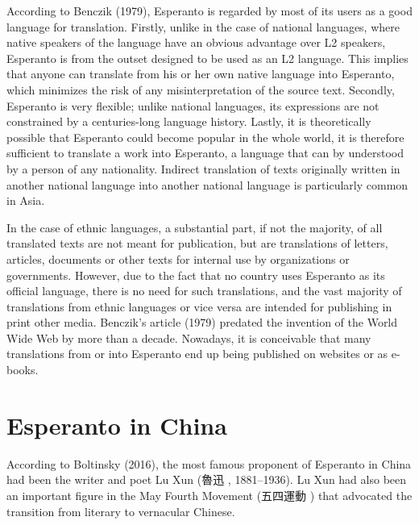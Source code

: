 
According to Benczik (1979), Esperanto is regarded by most of its users as a good language for translation.
Firstly, unlike in the case of national languages, where native speakers of the language have an obvious advantage over L2 speakers, Esperanto is from the outset designed to be used as an L2 language.
This implies that anyone can translate from his or her own native language into Esperanto, which minimizes the risk of any misinterpretation of the source text.
Secondly, Esperanto is very flexible; unlike national languages, its expressions are not constrained by a centuries-long language history.
Lastly, it is theoretically possible that Esperanto could become popular in the whole world, it is therefore sufficient to translate a work into Esperanto, a language that can by understood by a person of any nationality.
Indirect translation of texts originally written in another national language into another national language is particularly common in Asia.

In the case of ethnic languages, a substantial part, if not the majority, of all translated texts are not meant for publication, but are translations of letters, articles, documents or other texts for internal use by organizations or governments.
However, due to the fact that no country uses Esperanto as its official language, there is no need for such translations, and the vast majority of translations from ethnic languages or vice versa are intended for publishing in print other media.
Benczik's article (1979) predated the invention of the World Wide Web by more than a decade.
Nowadays, it is conceivable that many translations from or into Esperanto end up being published on websites or as e-books.

\section{Esperanto in China}
According to Boltinsky (2016), the most famous proponent of Esperanto in China had been the writer and poet Lu Xun (魯迅 , 1881--1936).
Lu Xun had also been an important figure in the May Fourth Movement (五四運動 ) that advocated the transition from literary to vernacular Chinese.

